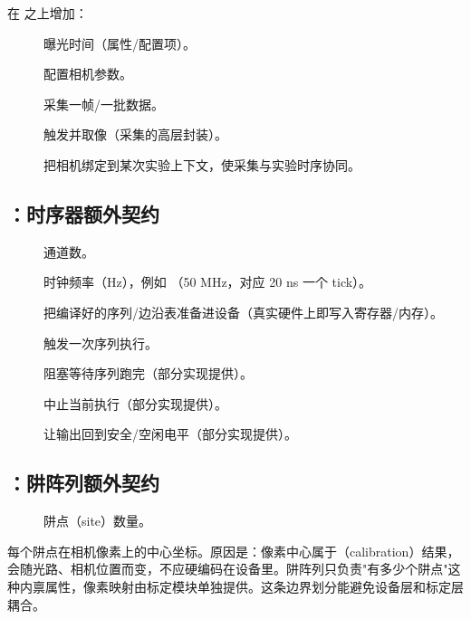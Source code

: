 \documentclass[11pt,oneside,openany]{book}
\begin{document}
在  之上增加：

\begin{description}
\item[] 曝光时间（属性/配置项）。
\item[] 配置相机参数。
\item[] 采集一帧/一批数据。
\item[] 触发并取像（采集的高层封装）。
\item[] 把相机绑定到某次实验上下文，使采集与实验时序协同。
\end{description}

\subsection{：时序器额外契约}

\begin{description}
\item[] 通道数。
\item[] 时钟频率（Hz），例如 （50 MHz，对应 20 ns 一个 tick）。
\item[] 把编译好的序列/边沿表准备进设备（真实硬件上即写入寄存器/内存）。
\item[] 触发一次序列执行。
\item[] 阻塞等待序列跑完（部分实现提供）。
\item[] 中止当前执行（部分实现提供）。
\item[] 让输出回到安全/空闲电平（部分实现提供）。
\end{description}

\subsection{：阱阵列额外契约}

\begin{description}
\item[] 阱点（site）数量。
\end{description}

\begin{notebox}[关键设计取舍]
 每个阱点在相机像素上的中心坐标。原因是：像素中心属于（calibration）结果，会随光路、相机位置而变，不应硬编码在设备里。阱阵列只负责"有多少个阱点"这种内禀属性，像素映射由标定模块单独提供。这条边界划分能避免设备层和标定层耦合。
\end{notebox}
\end{document}
